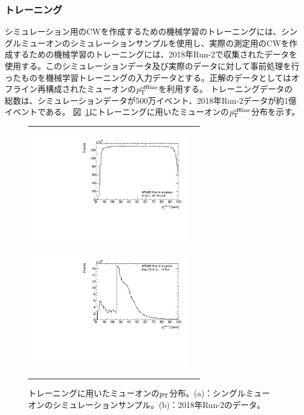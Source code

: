 \subsubsection{トレーニング}
シミュレーション用のCWを作成するための機械学習のトレーニングには、シングルミューオンのシミュレーションサンプルを使用し、実際の測定用のCWを作成するための機械学習のトレーニングには、2018年Run-2で収集されたデータを使用する。このシミュレーションデータ及び実際のデータに対して事前処理を行ったものを機械学習トレーニングの入力データとする。正解のデータとしてはオフライン再構成されたミューオンの$p_{\rm{T}}^{\rm{offline}}$を利用する。
トレーニングデータの総数は、シミュレーションデータが500万イベント、2018年Run-2データが約1億イベントである。
図~\ref{Inputdata}にトレーニングに用いたミューオンの$p_{\rm{T}}^{\rm{offline}}$分布を示す。
\begin{figure}
    \begin{tabular}{cc}
    \centering
    \begin{minipage}[b]{0.45\hsize}%
        \centering
        \hspace*{-1cm}
        \includegraphics[clip, width=7cm]{fig/4/MC_input_pt100.pdf}
        \subcaption{}
        \label{MC_input}
    \end{minipage}%
    \begin{minipage}[b]{0.6\hsize}%
        \centering
        \hspace*{-1cm}
        \includegraphics[clip, width=7cm]{fig/4/Data_input_pt.pdf}
        \subcaption{}
        \label{Data_input}
    \end{minipage}%
    \end{tabular}
    \caption{トレーニングに用いたミューオンの$p_{\rm{T}}$分布。(a)：シングルミューオンのシミュレーションサンプル。(b)：2018年Run-2のデータ。}
    \label{Inputdata}
\end{figure}

